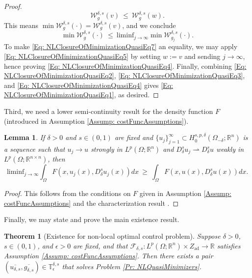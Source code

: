 \documentclass[11pt, reqno]{amsart}   	%
\theoremstyle{plain}
\numberwithin{equation}{section}
\newtheorem{theorem}[thm]{Theorem}
\newtheorem{lemma}[thm]{Lemma}
\def\de{\delta}
\def\ep{\epsilon}
\def\Om{\Omega}
\def\R{\mathbb{R}}
\def\liminf{\text{liminf}}
\begin{document}
\begin{proof}
    \begin{equation}\label{Eq: NLClosureOfMinimizationQuasiEq6}
        \mathcal{W}^{\de,  s}_g(v) \ \leq \ \mathcal{W}^{\de, s}_g(w).
    \end{equation}    
    This means $\min \mathcal{W}^{\de, s}_g(\cdot) = \mathcal{W}^{\de, s}_g(v)$, and we conclude
    \begin{equation}\label{Eq: NLClosureOfMinimizationQuasiEq7}
       \min \mathcal{W}^{\de, s}_g(\cdot) \ \leq \ \liminf_{j \rightarrow \infty}\min \mathcal{W}^{\de, s}_{g_j}(\cdot).
    \end{equation}
To make \eqref{Eq: NLClosureOfMinimizationQuasiEq7} an equality, we may apply \eqref{Eq: NLClosureOfMinimizationQuasiEq5} by setting $w := v$ and sending $j \rightarrow \infty$, hence proving \eqref{Eq: NLClosureOfMinimizationQuasiEq4}. Finally, combining \eqref{Eq: NLClosureOfMinimizationQuasiEq2}, \eqref{Eq: NLClosureOfMinimizationQuasiEq3}, and \eqref{Eq: NLClosureOfMinimizationQuasiEq4} gives \eqref{Eq: NLClosureOfMinimizationQuasiEq1}, as desired.
    \end{proof}

    Third, we need a lower semi-continuity result for the density function $F$ (introduced in Assumption \ref{Assump: costFuncAssumptions}).

    \begin{lemma}\label{Lem: lscDirect}
If $\de > 0$ and $s \in (0, 1)$ are fixed and $\{u_j\}^{\infty}_{j = 1} \subset H^{s, p, \de}_0(\Om_{-\de}; \R^n)$ is a sequence such that $u_j \rightarrow u$ strongly in $L^p(\Om; \R^n)$ and $D^s_{\de} u_j \rightharpoonup D^s_{\de} u$ weakly in $L^p(\Om; \R^{n \times n})$, then
            \begin{equation}\label{Eq: lscF}
                \liminf_{j \rightarrow \infty}\int_{\Om}F(x, u_j(x), D^s_{\de}u_j(x))dx \ \geq \ \int_{\Om}F(x, u(x), D^s_{\de}u(x))dx.
            \end{equation}
    \end{lemma}

    \begin{proof}
        This follows from the conditions on $F$ given in Assumption \ref{Assump: costFuncAssumptions} and the characterization result \cite[Theorem 5]{cueto2023variational}. 
    \end{proof}

Finally, we may state and prove the main existence result.

\begin{theorem}[Existence for non-local optimal control problem]\label{Thm: ExistenceControlNonlocalQuasi}
        Suppose $\de > 0$, $s \in (0, 1)$, and $\ep > 0$ are fixed, and that $\mathcal{F}_{\de, s}: L^p(\Om; \R^n) \times Z_{\text{ad}} \rightarrow \R$ satisfies Assumption \ref{Assump: costFuncAssumptions}. Then there exists a pair $(\overline{u_{\de, s}}, \overline{g_{\de, s}}) \in \mathbb{T}^{\de, s}_{\ep}$ that solves Problem \ref{Pr: NLQuasiMinimizers}.
    \end{theorem}
\end{document}
